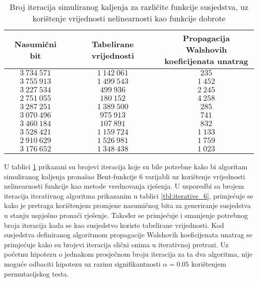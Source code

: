 \begin{table}[]
    \centering
    \begin{tabular}{ccc}
        Nasumični bit & Tabelirane vrijednosti & \makecell{Propagacija Walshovih \\ koeficijenata unatrag} \\ \hline
        $3\:734\:571$ & $1\:142\:061$ &    $235$ \\
        $3\:755\:913$ & $1\:499\:543$ & $1\:452$ \\
        $3\:227\:534$ &    $499\:936$ & $2\:245$ \\
        $2\:751\:055$ &    $180\:152$ & $4\:258$ \\
        $3\:287\:251$ & $1\:389\:500$ &    $285$ \\
        $3\:070\:496$ &    $975\:913$ &    $741$ \\
        $3\:460\:184$ &    $107\:891$ &    $832$ \\
        $3\:528\:421$ & $1\:159\:724$ & $1\:133$ \\
        $2\:910\:629$ & $1\:526\:981$ & $1\:759$ \\
        $3\:176\:652$ & $1\:348\:438$ & $1\:023$
    \end{tabular}
    \captionsetup{justification=centering}
    \caption{Broj iteracija simuliranog kaljenja za različite funkcije susjedstva, uz korištenje vrijednosti nelinearnosti kao funkcije dobrote}
    \label{tbl:simaneal_6_nonl}
\end{table}
U tablici \ref{tbl:simaneal_6_nonl} prikazani su brojevi iteracija koje su bile potrebne kako bi algoritam simuliranog kaljenja pronašao Bent-funkcije 6 varijabli uz korištenje vrijednosti nelinearnosti funkcije kao metode vrednovanja rješenja.
U usporedbi sa brojem iteracija iterativnog algoritma prikazanim u tablici \ref{tbl:iterative_6}, primjećuje se kako je pretraga korištenjem promjene nasumičnog bita za generiranje susjedstva u stanju uspješno pronaći rješenje.
Također se primjećuje i smanjenje potrebnog broja iteracija kada se kao susjedstvo koriste tabelirane vrijednosti.
Kod susjedstva definiranog algoritmom propagacije Walshovih koeficijenata unatrag se primjećuje kako su brojevi iteracija slični onima u iterativnoj pretrazi.
Uz početnu hipotezu o jednakom prosječnom broju iteracija za ta dva algoritma, nije moguće odbaciti hipotezu uz razinu signifikantnosti $\alpha = 0.05$ korištenjem permutacijskog testa.

